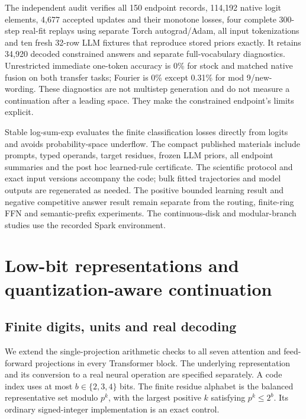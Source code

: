 \documentclass[11pt]{article}
\begin{document}
The independent audit verifies all 150 endpoint records, 114,192 native
logit elements, 4,677 accepted updates and their monotone losses, four
complete 300-step real-fit replays using separate Torch autograd/Adam,
all input tokenizations and ten fresh 32-row LLM fixtures that reproduce
stored priors exactly. It retains 34,920 decoded constrained answers and
separate full-vocabulary diagnostics. Unrestricted immediate one-token
accuracy is 0\% for stock and matched native fusion on both transfer tasks;
Fourier is 0\% except 0.31\% for mod 9/new-wording. These diagnostics are
not multistep generation and do not measure a continuation after a leading
space. They make the constrained endpoint's limits explicit.

Stable log-sum-exp evaluates the finite classification losses directly
from logits and avoids probability-space underflow. The compact published
materials include prompts, typed operands, target residues, frozen LLM priors,
all endpoint summaries and the post hoc learned-rule certificate. The
scientific protocol and exact input versions accompany the code; bulk fitted
trajectories and model outputs are regenerated as needed.
The positive bounded learning result and negative competitive answer result
remain separate from the routing, finite-ring FFN and semantic-prefix
experiments. The continuous-disk and modular-branch studies use the
recorded Spark environment.

\clearpage
\section{Low-bit representations and quantization-aware continuation}
\label{si:low-precision}

\subsection{Finite digits, units and real decoding}

We extend the single-projection arithmetic checks to all seven attention
and feed-forward projections in every Transformer block. The underlying
representation and its conversion to a real neural operation are specified
separately. A code index uses at most \(b\in\{2,3,4\}\) bits. The finite
residue alphabet is the balanced representative set modulo \(p^k\), with
the largest positive \(k\) satisfying \(p^k\leq 2^b\). Its ordinary
signed-integer implementation is an exact control.
\end{document}
